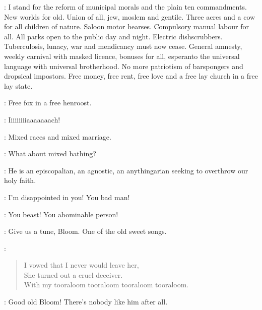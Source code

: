 \Bloom:
I stand for the reform of municipal morals and the plain ten commandments.
New worlds for old.
Union of all, jew, moslem and gentile.
Three acres and a cow for all children of nature.
Saloon motor hearses.
Compulsory manual labour for all.
All parks open to the public day and night.
Electric dishscrubbers.
Tuberculosis, lunacy, war and mendicancy must now cease.
General amnesty, weekly carnival with masked licence,
bonuses for all, esperanto the universal language with universal brotherhood.
No more patriotism of barspongers and dropsical impostors.
Free money, free rent, free love and a free lay church in a free lay state.

\OMaddenBurke:
Free fox in a free henroost.

\DavyByrne:
 Iiiiiiiiiaaaaaaach!

\Bloom:
Mixed races and mixed marriage.

\Lenehan:
What about mixed bathing?


\FatherFarley:
He is an episcopalian, an agnostic, an anythingarian
seeking to overthrow our holy faith.

\MrsRiordan:
I'm disappointed in you! You bad man!

\MotherGrogan:
You beast!
You abominable person!

\NoseyFlynn:
Give us a tune, Bloom.
One of the old sweet songs.

\Bloom:
\begin{verse}
    I vowed that I never would leave her,\\
    She turned out a cruel deceiver.\\
    With my tooraloom tooraloom tooraloom tooraloom.
\end{verse}

\HoppyHolohan:
Good old Bloom!
There's nobody like him after all.

